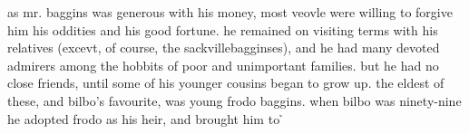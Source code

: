 \documentclass[12pt]{report}
\begin{document}
{\begin{minipage}{0.9\textwidth}
\hspace{0pt} as \hspace{0pt} mr. \hspace{0pt} baggins \hspace{0pt} was \hspace{0pt} generous \hspace{0pt} with \hspace{0pt} his \hspace{0pt} money, \hspace{0pt} most \hspace{0pt} veovle \hspace{0pt} were \hspace{0pt} willing \hspace{0pt} to \hspace{0pt} forgive \hspace{0pt} him \hspace{0pt} his \hspace{0pt} oddities \hspace{0pt} and \hspace{0pt} his \hspace{0pt} good \hspace{0pt} fortune. \hspace{0pt} he \hspace{0pt} remained \hspace{0pt} on \hspace{0pt} visiting \hspace{0pt} terms \hspace{0pt} with \hspace{0pt} his \hspace{0pt} relatives \hspace{0pt} (excevt, \hspace{0pt} of \hspace{0pt} course, \hspace{0pt} the \hspace{0pt} sackvillebagginses), \hspace{0pt} and \hspace{0pt} he \hspace{0pt} had \hspace{0pt} many \hspace{0pt} devoted \hspace{0pt} admirers \hspace{0pt} among \hspace{0pt} the \hspace{0pt} hobbits \hspace{0pt} of \hspace{0pt} poor \hspace{0pt} and \hspace{0pt} unimportant \hspace{0pt} families. \hspace{0pt} but \hspace{0pt} he \hspace{0pt} had \hspace{0pt} no \hspace{0pt} close \hspace{0pt} friends, \hspace{0pt} until \hspace{0pt} some \hspace{0pt} of \hspace{0pt} his \hspace{0pt} younger \hspace{0pt} cousins \hspace{0pt} began \hspace{0pt} to \hspace{0pt} grow \hspace{0pt} up. \hspace{0pt} the \hspace{0pt} eldest \hspace{0pt} of \hspace{0pt} these, \hspace{0pt} and \hspace{0pt} bilbo's \hspace{0pt} favourite, \hspace{0pt} was \hspace{0pt} young \hspace{0pt} frodo \hspace{0pt} baggins. \hspace{0pt} when \hspace{0pt} bilbo \hspace{0pt} was \hspace{0pt} ninety-nine \hspace{0pt} he \hspace{0pt} adopted \hspace{0pt} frodo \hspace{0pt} as \hspace{0pt} his \hspace{0pt} heir, \hspace{0pt} and \hspace{0pt} brought \hspace{0pt} him \hspace{0pt} to \h
\end{minipage}}
\end{document}
